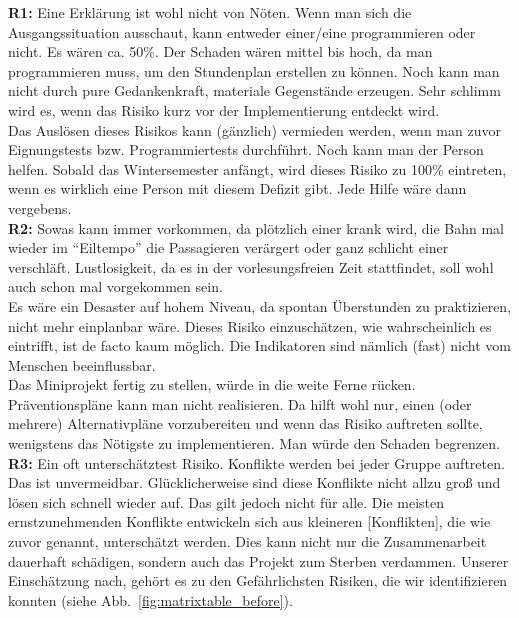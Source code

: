 \documentclass[fontsize=12pt,paper=a4,twoside]{scrartcl}
\begin{document}
\textbf{R1:} Eine Erklärung ist wohl nicht von Nöten. Wenn man sich die Ausgangssituation ausschaut, kann entweder einer/eine programmieren oder nicht. Es wären ca. 50\%. Der Schaden wären mittel bis hoch, da man programmieren muss, um den Stundenplan erstellen zu können. Noch kann man nicht durch pure Gedankenkraft, materiale Gegenstände erzeugen. Sehr schlimm wird es, wenn das Risiko kurz vor der Implementierung entdeckt wird.\\

Das Auslösen dieses Risikos kann (gänzlich) vermieden werden, wenn man zuvor Eignungstests bzw. Programmiertests durchführt. Noch kann man der Person helfen. Sobald das Wintersemester anfängt, wird dieses Risiko zu 100\% eintreten, wenn es wirklich eine Person mit diesem Defizit gibt. Jede Hilfe wäre dann vergebens.\\ 

\textbf{R2:} Sowas kann immer vorkommen, da plötzlich einer krank wird, die Bahn mal wieder im "`Eiltempo"' die Passagieren verärgert oder ganz schlicht einer verschläft.
Lustlosigkeit, da es in der vorlesungsfreien Zeit stattfindet, soll wohl auch schon mal vorgekommen sein.\\

Es wäre ein Desaster auf hohem Niveau, da spontan Überstunden zu praktizieren, nicht mehr einplanbar wäre. Dieses Risiko einzuschätzen, wie wahrscheinlich es eintrifft, ist de facto kaum möglich. Die Indikatoren sind nämlich (fast) nicht vom Menschen beeinflussbar.\\
Das Miniprojekt fertig zu stellen, würde in die weite Ferne rücken.\\
Präventionspläne kann man nicht realisieren. Da hilft wohl nur, einen (oder mehrere) Alternativpläne vorzubereiten und wenn das Risiko auftreten sollte, wenigstens das Nötigste zu implementieren. Man würde den Schaden begrenzen.\\ 

\textbf{R3:} Ein oft unterschätztest Risiko. Konflikte werden bei jeder Gruppe auftreten. Das ist unvermeidbar. Glücklicherweise sind diese Konflikte nicht allzu groß und lösen sich schnell wieder auf. Das gilt jedoch nicht für alle. Die meisten ernstzunehmenden Konflikte entwickeln sich aus kleineren [Konflikten], die wie zuvor genannt, unterschätzt werden. Dies kann nicht nur die Zusammenarbeit dauerhaft schädigen, sondern auch das Projekt zum Sterben verdammen. Unserer Einschätzung nach, gehört es zu den Gefährlichsten Risiken, die wir identifizieren konnten (siehe Abb.~\ref{fig:matrixtable_before}).\\
\end{document}
